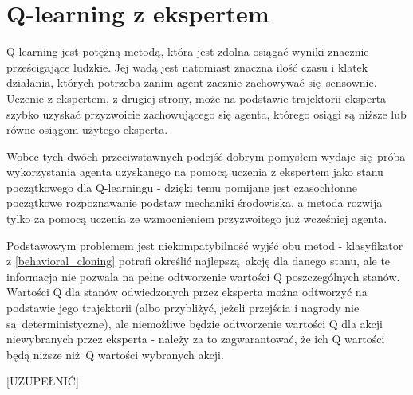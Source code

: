 \section{Q-learning z ekspertem}
Q-learning jest potężną metodą, która jest zdolna osiągać wyniki znacznie prześcigające ludzkie. Jej wadą jest natomiast znaczna ilość czasu i klatek działania, których potrzeba zanim agent zacznie zachowywać się sensownie. Uczenie z ekspertem, z drugiej strony, może na podstawie trajektorii eksperta szybko uzyskać przyzwoicie zachowującego się agenta, którego osiągi są niższe lub równe osiągom użytego eksperta.

Wobec tych dwóch przeciwstawnych podejść dobrym pomysłem wydaje się próba wykorzystania agenta uzyskanego na pomocą uczenia z ekspertem jako stanu początkowego dla Q-learningu - dzięki temu pomijane jest czasochłonne początkowe rozpoznawanie podstaw mechaniki środowiska, a metoda rozwija tylko za pomocą uczenia ze wzmocnieniem przyzwoitego już wcześniej agenta.

Podstawowym problemem jest niekompatybilność wyjść obu metod - klasyfikator z \ref{behavioral_cloning} potrafi określić najlepszą akcję dla danego stanu, ale te informacja nie pozwala na pełne odtworzenie wartości Q poszczególnych stanów. Wartości Q dla stanów odwiedzonych przez eksperta można odtworzyć na podstawie jego trajektorii (albo przybliżyć, jeżeli przejścia i nagrody nie są deterministyczne), ale niemożliwe będzie odtworzenie wartości Q dla akcji niewybranych przez eksperta - należy za to zagwarantować, że ich Q wartości będą niższe niż Q wartości wybranych akcji.

[UZUPEŁNIĆ]
